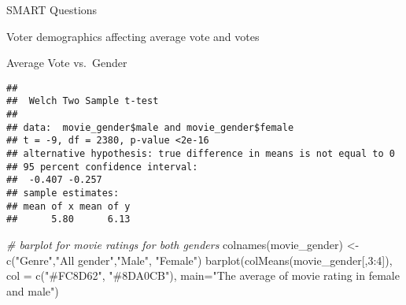 \documentclass[
  ignorenonframetext,
]{beamer}
\newenvironment{Shaded}{\begin{snugshade}}{\end{snugshade}}
\newcommand{\AttributeTok}[1]{\textcolor[rgb]{0.77,0.63,0.00}{#1}}
\newcommand{\CommentTok}[1]{\textcolor[rgb]{0.56,0.35,0.01}{\textit{#1}}}
\newcommand{\DecValTok}[1]{\textcolor[rgb]{0.00,0.00,0.81}{#1}}
\newcommand{\FunctionTok}[1]{\textcolor[rgb]{0.00,0.00,0.00}{#1}}
\newcommand{\NormalTok}[1]{#1}
\newcommand{\OtherTok}[1]{\textcolor[rgb]{0.56,0.35,0.01}{#1}}
\newcommand{\SpecialCharTok}[1]{\textcolor[rgb]{0.00,0.00,0.00}{#1}}
\newcommand{\StringTok}[1]{\textcolor[rgb]{0.31,0.60,0.02}{#1}}
\begin{document}
\begin{frame}[fragile]{SMART Questions}
\begin{block}{Voter demographics affecting average vote and votes}
\begin{block}{Average Vote vs.~Gender}
\begin{Shaded}
\end{Shaded}

\begin{verbatim}
## 
##  Welch Two Sample t-test
## 
## data:  movie_gender$male and movie_gender$female
## t = -9, df = 2380, p-value <2e-16
## alternative hypothesis: true difference in means is not equal to 0
## 95 percent confidence interval:
##  -0.407 -0.257
## sample estimates:
## mean of x mean of y 
##      5.80      6.13
\end{verbatim}

\begin{Shaded}
\begin{Highlighting}[]
\CommentTok{\# barplot for movie ratings for both genders}
\FunctionTok{colnames}\NormalTok{(movie\_gender) }\OtherTok{\textless{}{-}} \FunctionTok{c}\NormalTok{(}\StringTok{"Genre"}\NormalTok{,}\StringTok{"All gender"}\NormalTok{,}\StringTok{"Male"}\NormalTok{, }\StringTok{"Female"}\NormalTok{)}
\FunctionTok{barplot}\NormalTok{(}\FunctionTok{colMeans}\NormalTok{(movie\_gender[,}\DecValTok{3}\SpecialCharTok{:}\DecValTok{4}\NormalTok{]), }\AttributeTok{col =} \FunctionTok{c}\NormalTok{(}\StringTok{"\#FC8D62"}\NormalTok{, }\StringTok{"\#8DA0CB"}\NormalTok{), }\AttributeTok{main=}\StringTok{"The average of movie rating in female and male"}\NormalTok{)}
\end{Highlighting}
\end{Shaded}


\end{block}
\end{block}
\end{frame}
\end{document}
